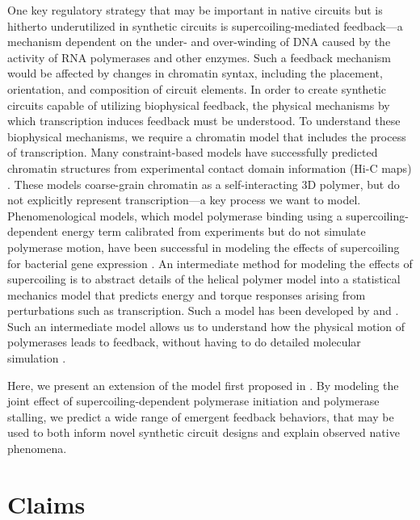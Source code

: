\documentclass[11pt]{article}
\begin{document}
One key regulatory strategy that may be important in native circuits but is hitherto underutilized in synthetic circuits is supercoiling-mediated feedback---a mechanism dependent on the under- and over-winding of DNA caused by the activity of RNA polymerases and other enzymes. Such a feedback mechanism would be affected by changes in chromatin syntax, including the placement, orientation, and composition of circuit elements.
In order to create synthetic circuits capable of utilizing biophysical feedback, the physical mechanisms by which transcription induces feedback must be understood. To understand these biophysical mechanisms, we require a chromatin model that includes the process of transcription. Many constraint-based models have successfully predicted chromatin structures from experimental contact domain information (Hi-C maps) \parencite{distefanoTranscriptionalActivationCell2020,serraRestraintbasedThreedimensionalModeling2015,abbasIntegratingHiCFISH2019}. These models coarse-grain chromatin as a self-interacting 3D polymer, but do not explicitly represent transcription---a key process we want to model. Phenomenological models, which model polymerase binding using a supercoiling-dependent energy term calibrated from experiments but do not simulate polymerase motion, have been successful in modeling the effects of supercoiling for bacterial gene expression  \parencite{elhoudaiguiBacterialGenomeArchitecture2019a,yeungBiophysicalConstraintsArising2017}. An intermediate method for modeling the effects of supercoiling is to abstract details of the helical polymer model into a statistical mechanics model that predicts energy and torque responses arising from perturbations such as transcription. Such a model has been developed by \textcite{markoSupercoiledBraidedDNA1997,markoTorqueDynamicsLinking2007} and \textcite{sevierPropertiesGeneExpression2018}. Such an intermediate model allows us to understand how the physical motion of polymerases leads to feedback, without having to do detailed molecular simulation \parencite{fosadoNonequilibriumDynamicsAction2021}.

Here, we present an extension of the model first proposed in \parencite{sevierMechanicalPropertiesDNA2019}. By modeling the joint effect of supercoiling-dependent polymerase initiation and polymerase stalling, we predict a wide range of emergent feedback behaviors, that may be used to both inform novel synthetic circuit designs and explain observed native phenomena.
\section{Claims}
\end{document}

